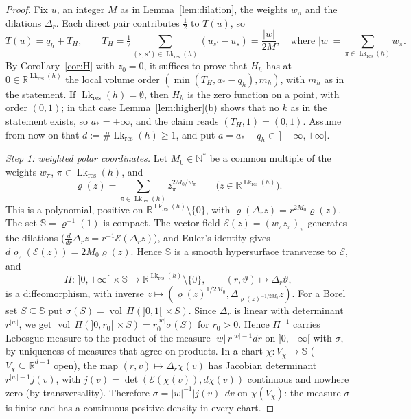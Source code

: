 \documentclass[11pt,a4paper]{article}
\theoremstyle{definition}
\theoremstyle{remark}
\numberwithin{equation}{section}
\newcommand{\N}{\mathbb{N}}
\newcommand{\R}{\mathbb{R}}
\newcommand{\vol}{\operatorname{vol}}
\newcommand{\abs}[1]{\lvert #1\rvert}
\newcommand{\Lk}{\operatorname{Lk}}
\begin{document}
\begin{proof}
Fix $u$, an integer $M$ as in Lemma~\ref{lem:dilation}, the weights $w_\pi$ and the dilations $\Delta_r$. Each direct pair contributes $\frac{1}{2}$ to $T(u)$, so
\[
T(u)=q_h+T_H,\qquad T_H=\tfrac12\sum_{(s,s')\in\Lk_{\mathrm{res}}(h)}(u_{s'}-u_s)=\frac{\abs w}{2M},\quad\text{where }\abs w=\sum_{\pi\in\Lk_{\mathrm{res}}(h)}w_\pi .
\]
By Corollary~\ref{cor:H} with $z_0=0$, it suffices to prove that $H_h$ has at $0\in\R^{\Lk_{\mathrm{res}}(h)}$ the local volume order $(\min(T_H,a_*-q_h),m_h)$, with $m_h$ as in the statement. If $\Lk_{\mathrm{res}}(h)=\emptyset$, then $H_h$ is the zero function on a point, with order $(0,1)$; in that case Lemma~\ref{lem:higher}(b) shows that no $k$ as in the statement exists, so $a_*=+\infty$, and the claim reads $(T_H,1)=(0,1)$. Assume from now on that $d:=\#\Lk_{\mathrm{res}}(h)\ge1$, and put $a=a_*-q_h\in\,]-\infty,+\infty]$.

\emph{Step 1: weighted polar coordinates.} Let $M_0\in\N^*$ be a common multiple of the weights $w_\pi$, $\pi\in\Lk_{\mathrm{res}}(h)$, and
\[
\varrho(z)=\sum_{\pi\in\Lk_{\mathrm{res}}(h)}z_\pi^{2M_0/w_\pi}\qquad\bigl(z\in\R^{\Lk_{\mathrm{res}}(h)}\bigr).
\]
This is a polynomial, positive on $\R^{\Lk_{\mathrm{res}}(h)}\setminus\{0\}$, with $\varrho(\Delta_rz)=r^{2M_0}\varrho(z)$. The set $\mathbb S=\varrho^{-1}(1)$ is compact. The vector field $\mathcal E(z)=(w_\pi z_\pi)_\pi$ generates the dilations ($\frac{d}{dr}\Delta_rz=r^{-1}\mathcal E(\Delta_rz)$), and Euler's identity gives $d\varrho_z(\mathcal E(z))=2M_0\varrho(z)$. Hence $\mathbb S$ is a smooth hypersurface transverse to $\mathcal E$, and
\[
\Pi:\,]0,+\infty[\,\times\mathbb S\to\R^{\Lk_{\mathrm{res}}(h)}\setminus\{0\},\qquad(r,\vartheta)\mapsto\Delta_r\vartheta,
\]
is a diffeomorphism, with inverse $z\mapsto(\varrho(z)^{1/2M_0},\Delta_{\varrho(z)^{-1/2M_0}}z)$. For a Borel set $S\subseteq\mathbb S$ put $\sigma(S)=\vol\,\Pi(]0,1[\,\times S)$. Since $\Delta_r$ is linear with determinant $r^{\abs w}$, we get $\vol\,\Pi(]0,r_0[\,\times S)=r_0^{\abs w}\sigma(S)$ for $r_0>0$. Hence $\Pi^{-1}$ carries Lebesgue measure to the product of the measure $\abs w\,r^{\abs w-1}dr$ on $]0,+\infty[$ with $\sigma$, by uniqueness of measures that agree on products. In a chart $\chi:V_\chi\to\mathbb S$ ($V_\chi\subseteq\R^{d-1}$ open), the map $(r,v)\mapsto\Delta_r\chi(v)$ has Jacobian determinant $r^{\abs w-1}j(v)$, with $j(v)=\det(\mathcal E(\chi(v)),d\chi(v))$ continuous and nowhere zero (by transversality). Therefore $\sigma=\abs w^{-1}\abs{j(v)}\,dv$ on $\chi(V_\chi)$: the measure $\sigma$ is finite and has a continuous positive density in every chart.


\end{proof}
\end{document}
